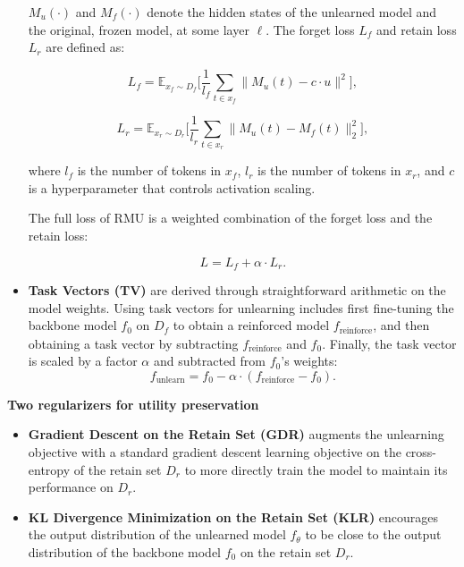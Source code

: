 \begin{itemize}[nolistsep, leftmargin=*]
        \( M_u(\cdot) \) and \( M_f(\cdot) \) denote the hidden states of the unlearned model and the original, frozen model, at some layer \(\ell\). The forget loss $L_f$ and retain loss $L_r$ are defined as:
        
        \[
        L_f = \mathbb{E}_{x_f \sim D_f} 
        \Bigg[ \frac{1}{l_f} \sum_{t \in x_f} \Big\| M_u(t) - c \cdot u \Big\|^2 \Bigg],
        \]
        
        \[
        L_r = \mathbb{E}_{x_r \sim D_r} 
        \Bigg[ \frac{1}{l_r} \sum_{t \in x_r} \Big\| M_u(t) - M_f(t) \Big\|_2^2 \Bigg],
        \]
        
        where \( l_f \) is the number of tokens in \( x_f \), \( l_r \) is the number of tokens in \( x_r \), and \( c \) is a hyperparameter that controls activation scaling.
        
        The full loss of RMU is a weighted combination of the forget loss and the retain loss:
        
        \[
        L = L_f + \alpha \cdot L_r.
        \]
        \item \textbf{Task Vectors (TV)} \citep{ilharco2022editing} are derived through straightforward arithmetic on the model weights. Using task vectors for unlearning includes first fine-tuning the backbone model \( f_0 \) on \( D_{\mathit{f}} \) to obtain a reinforced model \( f_{\text{reinforce}} \), and then obtaining a task vector by subtracting \( f_{\text{reinforce}} \) and \( f_0 \). Finally, the task vector is scaled by a factor \( \alpha \) and subtracted from \( f_0 \)'s weights:
        \[
        f_{\text{unlearn}} = f_0 - \alpha \cdot (f_{\text{reinforce}} - f_0).
        \]
    
    \end{itemize}

\noindent\textbf{Two regularizers for utility preservation} 
\begin{itemize}[nolistsep, leftmargin=*]
    \item \textbf{Gradient Descent on the Retain Set (GDR)} \citep{maini2024tofu,zhang2024negative} augments the unlearning objective with a standard gradient descent learning objective on the cross-entropy of the retain set \( D_r \) to more directly train the model to maintain its performance on \( D_r \).
    
    \item \textbf{KL Divergence Minimization on the Retain Set (KLR)} \citep{maini2024tofu,zhang2024negative} encourages the output distribution of the unlearned model \( f_\theta \) to be close to the output distribution of the backbone model \( f_0 \) on the retain set \( D_r \).
\end{itemize}

